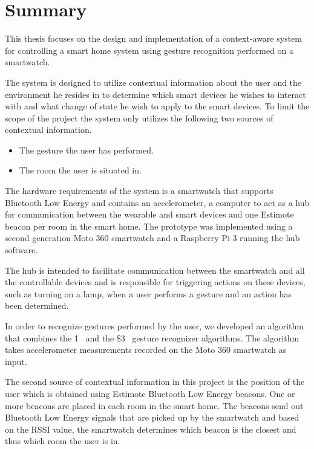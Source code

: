 \section*{Summary}
\label{formalities:summary}

This thesis focuses on the design and implementation of a context-aware system for controlling a smart home system using gesture recognition performed on a smartwatch.

The system is designed to utilize contextual information about the user and the environment he resides in to determine which smart devices he wishes to interact with and what change of state he wish to apply to the smart devices.
To limit the scope of the project the system only utilizes the following two sources of contextual information. 

\begin{itemize}
\item The gesture the user has performed.
\item The room the user is situated in.
\end{itemize}

The hardware requirements of the system is a smartwatch that supports Bluetooth Low Energy and contains an accelerometer, a computer to act as a hub for communication between the wearable and smart devices and one Estimote beacon per room in the smart home.
The prototype was implemented using a second generation Moto 360 smartwatch and a Raspberry Pi 3 running the hub software.

The hub is intended to facilitate communication between the smartwatch and all the controllable devices and is responsible for triggering actions on these devices, such as turning on a lamp, when a user performs a gesture and an action has been determined.

In order to recognize gestures performed by the user, we developed an algorithm that combines the 1\textcent~\cite{herold20121} and the \$3~\cite{threedollar} gesture recognizer algorithms. The algorithm takes accelerometer measurements recorded on the Moto 360 smartwatch as input.

The second source of contextual information in this project is the position of the user which is obtained using Estimote Bluetooth Low Energy beacons. One or more beacons are placed in each room in the smart home.
The beacons send out Bluetooth Low Energy signals that are picked up by the smartwatch and based on the RSSI value, the smartwatch determines which beacon is the closest and thus which room the user is in.

